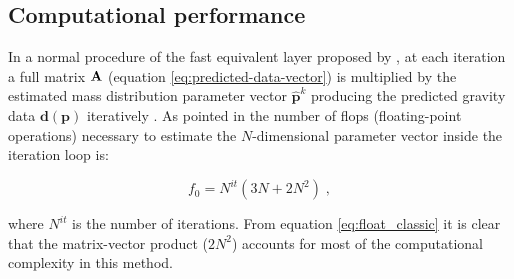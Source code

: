 \documentclass[manuscript,revised]{geophysics}
\begin{document}








\subsection{Computational performance}
In a normal procedure of the fast equivalent layer proposed by \citet{siqueira-etal2017}, at each iteration a full matrix $\tensor{A}$ (equation \ref{eq:predicted-data-vector}) is multiplied by the estimated mass distribution parameter vector $\hat{\mathbf{p}}^k$ producing the predicted gravity data $\mathbf{d(p)}$  iteratively . As pointed in \citet{siqueira-etal2017} the number of flops (floating-point operations) necessary to estimate the $N$-dimensional parameter vector inside the iteration loop is:

\begin{equation}
f_0 = N^{it} (3N + 2N^2) \; ,
\label{eq:float_classic}
\end{equation}

\noindent where $N^{it}$ is the number of iterations. From equation \ref{eq:float_classic} it is clear that the matrix-vector product ($2N^2$) accounts for most of the computational complexity in this method.
\end{document}
